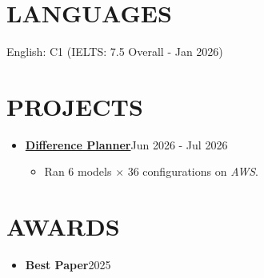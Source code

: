 \documentclass[a4paper,11pt]{article}
\newcommand{\resumeSubHeadingListStart}{\begin{itemize}[leftmargin=0pt, label={}, itemsep=5pt]}
\newcommand{\resumeSubHeadingListEnd}{\end{itemize}}
\newcommand{\resumeItemListStart}{\begin{itemize}}
\newcommand{\resumeItemListEnd}{\end{itemize}}
\newcommand{\resumeItem}[1]{\item #1}
\newcommand{\resumeProjectHeading}[2]{\item #1\hfill{\color{muted}#2}}
\begin{document}
\section{LANGUAGES}
English: C1 (IELTS: 7.5 Overall - Jan 2026)\par

\section{PROJECTS}
\resumeSubHeadingListStart
  \resumeProjectHeading
    {\href{https://example.org/planner}{\textbf{Difference Planner}}}{Jun 2026 - Jul 2026}
    \resumeItemListStart
      \resumeItem{Ran 6 models $\times$ 36 configurations on \textit{AWS}.}
    \resumeItemListEnd
\resumeSubHeadingListEnd

\section{AWARDS}
\resumeSubHeadingListStart
  \resumeProjectHeading
    {\textbf{Best Paper}}{2025}
\resumeSubHeadingListEnd
\end{document}
